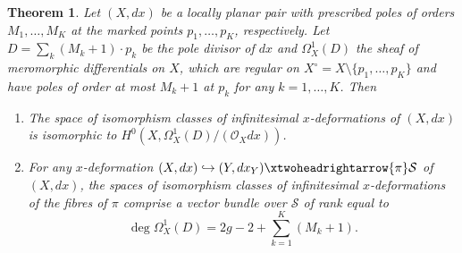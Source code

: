\documentclass[11pt,twoside]{amsart}
\theoremstyle{plain}
\newtheorem{theorem}{Theorem}[section]
\newcommand{\Sm}{\mathcal{S}}
\newcommand{\Tm}{\mathcal{T}}
\newcommand{\Sh}[1]{\mathcal{#1}} %
\newcommand{\dfx}{dx}
\begin{document}
%
%
\begin{theorem}\label{l3}
Let $(X,\dfx)$ be a locally planar pair with prescribed poles of orders $M_1,\ldots,M_K$ at the marked points $p_1,\ldots,p_K$, respectively. Let $D=\sum_k(M_k+1)\cdot p_k$ be the pole divisor of $\dfx$ and $\Omega_X^1(D)$ the sheaf of meromorphic differentials on $X$, which are regular on $X^\circ=X\setminus\{p_1,\ldots,p_K\}$ and have poles of order at most $M_k+1$ at $p_k$ for any $k=1,\ldots,K$. Then
\begin{enumerate}
\item[(i)] The space of isomorphism classes of infinitesimal $x$-deformations of $(X,\dfx)$ is isomorphic to $H^0(X,\Omega^1_X(D)/(\Sh{O}_Xdx))$.
\item[(ii)] For any $x$-deformation $(X,\dfx)\hookrightarrow(Y,\dfx_Y)\xtwoheadrightarrow{\pi}\Sm$ of $(X,\dfx)$, the spaces of isomorphism classes of infinitesimal $x$-deformations of the fibres of $\pi$ comprise a vector bundle over $\Sm$ of rank equal to
$$\deg\Omega^1_X(D)=2g-2+\sum_{k=1}^K(M_k+1).$$
\end{enumerate}
\end{theorem}
\end{document}
